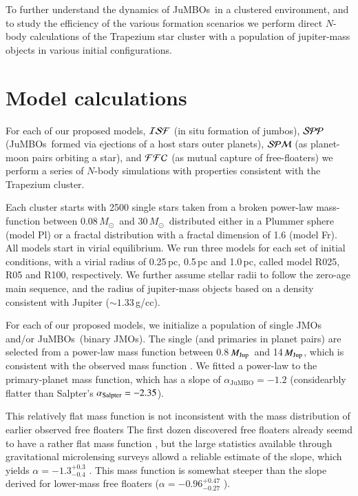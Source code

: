 \documentclass[submission,phys]{lib/SciPost}
\newcommand{\MSun}{\mbox{${M}_\odot$}}
\newcommand{\MJup}{\mbox{${M}_{\rm Jup}$}}
\newcommand{\jumbo}{\mbox{JuMBO}}
\newcommand{\jumbos}{\mbox{JuMBOs}}
\begin{document}
To further understand the dynamics of \jumbos\, in a clustered
environment, and to study the efficiency of the various formation
scenarios we perform direct $N$-body calculations of the Trapezium
star cluster with a population of jupiter-mass objects in various
initial configurations.

\section{Model calculations}

For each of our proposed models, ${\cal ISF}$ (in situ formation of
jumbos), ${\cal SPP}$ (\jumbos\, formed via ejections of a host stars
outer planets), ${\cal SPM}$ (as planet-moon pairs orbiting a star),
and ${\cal FFC}$ (as mutual capture of free-floaters) we perform a
series of $N$-body simulations with properties consistent with the
Trapezium cluster.

Each cluster starts with 2500 single stars taken from a broken
power-law mass-function \cite{2002Sci...295...82K} between
$0.08$\,\MSun\, and $30$\,\MSun\, distributed either in a Plummer
sphere (model Pl) or a fractal distribution with a fractal dimension
of 1.6 (model Fr). All models start in virial equilibrium.  We run
three models for each set of initial conditions, with a virial radius
of 0.25\,pc, 0.5\,pc and 1.0\,pc, called model R025, R05 and R100,
respectively.  We further assume stellar radii to follow the zero-age
main sequence, and the radius of jupiter-mass objects based on a
density consistent with Jupiter ($\sim 1.33$\,g/cc).

For each of our proposed models, we initialize a population of single
JMOs and/or \jumbos\, (binary JMOs). The single (and primaries in
planet pairs) are selected from a power-law mass function between
0.8\,\MJup\, and 14\,\MJup, which is consistent with the observed mass
function \cite{2023arXiv231001231P}. We fitted a power-law to the
primary-planet mass function, which has a slope of $\alpha_{\jumbo}
=-1.2$ (considearbly flatter than Salpter's $\alpha_{\rm Salpter} =
-2.35$).

This relatively flat mass function is not inconsistent with the mass
distribution of earlier observed free floaters The first dozen
discovered free floaters already seemd to have a rather flat mass
function \cite{2000MNRAS.314..858L}, but the large statistics
available through gravitational microlensing surveys allowd a reliable
estimate of the slope, which yields $\alpha = -1.3^{+0.3}_{-0.4}$
\cite{2011Natur.473..349S}. This mass function is somewhat steeper
than the slope derived for lower-mass free floaters ($\alpha =
-0.96^{+0.47}_{-0.27}$ \cite{2023AJ....166..108S}).
\end{document}

